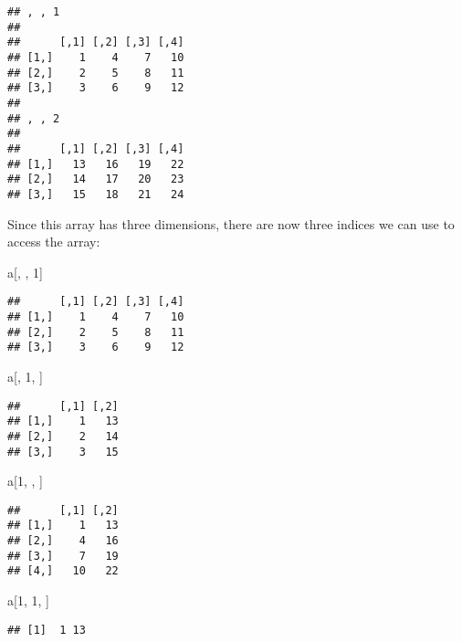 \documentclass[]{article}
\newenvironment{Shaded}{\begin{snugshade}}{\end{snugshade}}
\newcommand{\DecValTok}[1]{\textcolor[rgb]{0.00,0.00,0.81}{#1}}
\newcommand{\NormalTok}[1]{#1}
\begin{document}
\begin{verbatim}
## , , 1
## 
##      [,1] [,2] [,3] [,4]
## [1,]    1    4    7   10
## [2,]    2    5    8   11
## [3,]    3    6    9   12
## 
## , , 2
## 
##      [,1] [,2] [,3] [,4]
## [1,]   13   16   19   22
## [2,]   14   17   20   23
## [3,]   15   18   21   24
\end{verbatim}

Since this array has three dimensions, there are now three indices we
can use to access the array:

\begin{Shaded}
\begin{Highlighting}[]
\NormalTok{a[, , }\DecValTok{1}\NormalTok{]}
\end{Highlighting}
\end{Shaded}

\begin{verbatim}
##      [,1] [,2] [,3] [,4]
## [1,]    1    4    7   10
## [2,]    2    5    8   11
## [3,]    3    6    9   12
\end{verbatim}

\begin{Shaded}
\begin{Highlighting}[]
\NormalTok{a[, }\DecValTok{1}\NormalTok{, ]}
\end{Highlighting}
\end{Shaded}

\begin{verbatim}
##      [,1] [,2]
## [1,]    1   13
## [2,]    2   14
## [3,]    3   15
\end{verbatim}

\begin{Shaded}
\begin{Highlighting}[]
\NormalTok{a[}\DecValTok{1}\NormalTok{, , ]}
\end{Highlighting}
\end{Shaded}

\begin{verbatim}
##      [,1] [,2]
## [1,]    1   13
## [2,]    4   16
## [3,]    7   19
## [4,]   10   22
\end{verbatim}

\begin{Shaded}
\begin{Highlighting}[]
\NormalTok{a[}\DecValTok{1}\NormalTok{, }\DecValTok{1}\NormalTok{, ]}
\end{Highlighting}
\end{Shaded}

\begin{verbatim}
## [1]  1 13
\end{verbatim}
\end{document}
